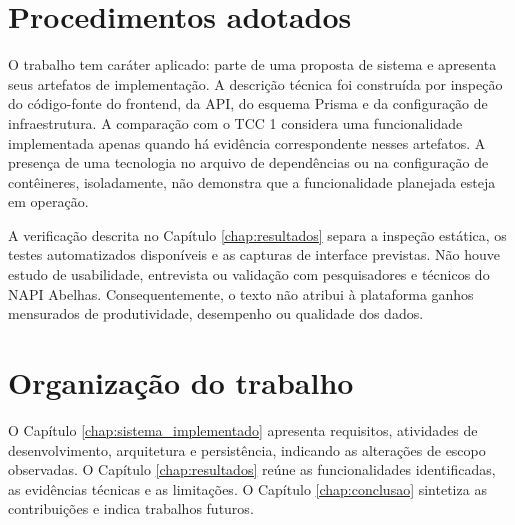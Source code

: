 \section{Procedimentos adotados}
\label{sec:metodologia}

O trabalho tem caráter aplicado: parte de uma proposta de sistema e apresenta seus artefatos de implementação. A descrição técnica foi construída por inspeção do código-fonte do frontend, da API, do esquema Prisma e da configuração de infraestrutura. A comparação com o TCC 1 considera uma funcionalidade implementada apenas quando há evidência correspondente nesses artefatos. A presença de uma tecnologia no arquivo de dependências ou na configuração de contêineres, isoladamente, não demonstra que a funcionalidade planejada esteja em operação.

A verificação descrita no Capítulo \ref{chap:resultados} separa a inspeção estática, os testes automatizados disponíveis e as capturas de interface previstas. Não houve estudo de usabilidade, entrevista ou validação com pesquisadores e técnicos do NAPI Abelhas. Consequentemente, o texto não atribui à plataforma ganhos mensurados de produtividade, desempenho ou qualidade dos dados.

\section{Organização do trabalho}

O Capítulo \ref{chap:sistema_implementado} apresenta requisitos, atividades de desenvolvimento, arquitetura e persistência, indicando as alterações de escopo observadas. O Capítulo \ref{chap:resultados} reúne as funcionalidades identificadas, as evidências técnicas e as limitações. O Capítulo \ref{chap:conclusao} sintetiza as contribuições e indica trabalhos futuros.
